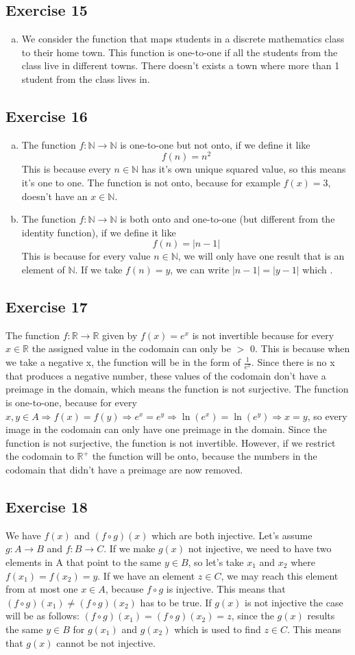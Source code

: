 \documentclass[a4paper]{article}
\newcommand{\exercise}[2]{\subsection*{Exercise #1}{#2}}
\newcommand{\exerciseenum}[2]{\subsection*{Exercise #1}{\begin{enumerate}[a)]#2\end{enumerate}}}
\newcommand{\NN}{\ensuremath{\mathbb{N}}}
\newcommand{\RR}{\ensuremath{\mathbb{R}}}
\newcommand{\RRp}{\ensuremath{\mathbb{R}^{+}}}
\begin{document}
\exerciseenum{15}{%
\addtocounter{enumi}{3}
\item%
We consider the function that maps students in a discrete mathematics class
to their home town.
This function is one-to-one if all the students from the class live in different towns. There doesn't exists a town where more than 1 student from the class lives in.
}

\exerciseenum{16}{%
\item%
The function $f:\NN\to\NN$ is
one-to-one but not onto,
if we define it like
\[
f(n) = n^2
\]
This is because every $n \in \mathbb{N}$ has it's own unique squared value, so this means it's one to one. The function is not onto, because for example $f(x) = 3$, doesn't have an $x \in \mathbb{N}$.

\addtocounter{enumi}{1}
\item%
The function $f:\NN\to\NN$ is
both onto and one-to-one (but different from the identity function),
if we define it like
\[
f(n) = |n - 1|
\]
This is because for every value $n \in \mathbb{N}$, we will only have one result that is an element of $\mathbb{N}$. If we take $f(n) = y$, we can write $|n - 1| = |y - 1|$ which .
}

\exercise{17}{%
The function $f:\RR\to\RR$ given by $f(x)=e^x$ is not invertible because for every $x \in \mathbb{R}$ the assigned value in the codomain can only be $>$ 0. This is because when we take a negative x, the function will be in the form of $\frac{1}{e^x}$. Since there is no x that produces a negative number, these values of the codomain don't have a preimage in the domain, which means the function is not surjective. The function is one-to-one, because for every $x, y \in A \Longrightarrow f(x) = f(y) \Longrightarrow e^x = e^y \Longrightarrow \ln(e^x) = \ln(e^y) \Longrightarrow x = y$, so every image in the codomain can only have one preimage in the domain. Since the function is not surjective, the function is not invertible.
However, if we restrict the codomain to $\RRp$ the function will be onto, because the numbers in the codomain that didn't have a preimage are now removed.
}

\exercise{18}{%
We have $f(x)$ and $(f \circ g)(x)$ which are both injective. Let's assume $g: A \longrightarrow B$ and $f: B \longrightarrow C$. If we make $g(x)$ not injective, we need to have two elements in A that point to the same $y \in B$, so let's take $x_1$ and $x_2$ where $f(x_1) = f(x_2) = y$. If we have an element $z \in C$, we may reach this element from at most one $x \in A$, because $f \circ g$ is injective. This means that $(f \circ g)(x_1) \neq (f \circ g)(x_2)$ has to be true. If $g(x)$ is not injective the case will be as follows: $(f \circ g)(x_1) = (f \circ g)(x_2) = z$, since the $g(x)$ results the same $y \in B$ for $g(x_1)$ and $g(x_2)$ which is used to find $z \in C$. This means that $g(x)$ cannot be not injective.
}
\end{document}
